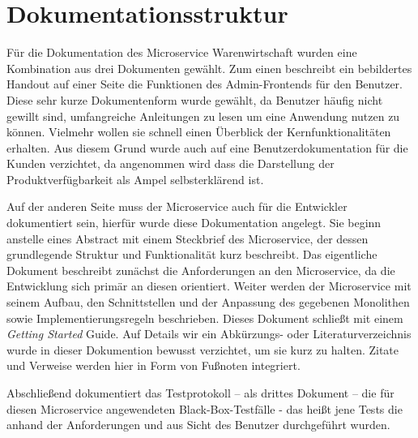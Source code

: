 \section{Dokumentationsstruktur}
\label{sec: Dokumentationsstruktur}

Für die Dokumentation des Microservice Warenwirtschaft wurden eine Kombination aus drei Dokumenten gewählt. Zum einen beschreibt ein bebildertes Handout auf einer Seite die Funktionen des Admin-Frontends für den Benutzer. Diese sehr kurze Dokumentenform wurde gewählt, da Benutzer häufig nicht gewillt sind, umfangreiche Anleitungen zu lesen um eine Anwendung nutzen zu können. Vielmehr wollen sie schnell einen Überblick der Kernfunktionalitäten erhalten. Aus diesem Grund wurde auch auf eine Benutzerdokumentation für die Kunden verzichtet, da angenommen wird dass die Darstellung der Produktverfügbarkeit als Ampel selbsterklärend ist.\par 
Auf der anderen Seite muss der Microservice auch für die Entwickler dokumentiert sein, hierfür wurde diese Dokumentation angelegt. Sie beginn anstelle eines Abstract mit einem Steckbrief des Microservice, der dessen grundlegende Struktur und Funktionalität kurz beschreibt. Das eigentliche Dokument beschreibt zunächst die Anforderungen an den Microservice, da die Entwicklung sich primär an diesen orientiert. Weiter werden der Microservice mit seinem Aufbau, den Schnittstellen und der Anpassung des gegebenen Monolithen sowie Implementierungsregeln beschrieben. Dieses Dokument schließt mit einem \textit{Getting Started} Guide. Auf Details wir ein Abkürzungs- oder Literaturverzeichnis wurde in dieser Dokumention bewusst verzichtet, um sie kurz zu halten. Zitate und Verweise werden hier in Form von Fußnoten integriert.\par 
Abschließend dokumentiert das Testprotokoll -- als drittes Dokument -- die für diesen Microservice angewendeten Black-Box-Testfälle - das heißt jene Tests die anhand der Anforderungen und aus Sicht des Benutzer durchgeführt wurden.